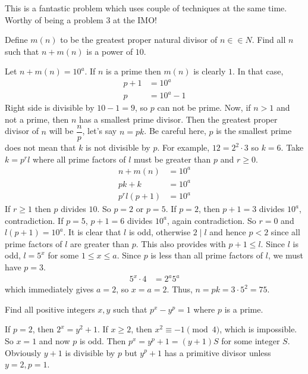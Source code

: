 \begin{note}
	This is a fantastic problem which uses couple of techniques at the same time. Worthy of being a problem $3$ at the IMO!
\end{note}

\begin{problem}
	Define $m(n)$ to be the greatest proper natural divisor of $n \in\in N$. Find all $n$ such that $n + m(n)$ is a power of $10$.
\end{problem}

\begin{solution}
	Let $n+m(n)=10^a$. If $n$ is a prime then $m(n)$ is clearly $1$. In that case,
	\begin{align*}
	p+1 & = 10^a\\
	p & = 10^a-1
	\end{align*}
	Right side is divisible by $10-1=9$, so $p$ can not be prime. Now, if $n>1$ and not a prime, then $n$ has a smallest prime divisor. Then the greatest proper divisor of $n$ will be $\dfrac{n}{p}$, let's say $n=pk$. Be careful here, $p$ is the smallest prime does not mean that $k$ is not divisible by $p$. For example, $12=2^2\cdot3$ so $k=6$. Take $k=p^rl$ where all prime factors of $l$ must be greater than $p$ and $r\geq0$.
	\begin{align*}
	n+m(n) & = 10^a\\
	pk+k & = 10^a\\
	p^rl(p+1) & = 10^a
	\end{align*}
	If $r\geq1$ then $p$ divides $10$. So $p=2$ or $p=5$. If $p=2$, then $p+1=3$ divides $10^a$, contradiction. If $p=5$, $p+1=6$ divides $10^a$, again contradiction. So $r=0$ and $l(p+1)=10^a$. It is clear that $l$ is odd, otherwise $2\mid l$ and hence $p<2$ since all prime factors of $l$ are greater than $p$. This also provides with $p+1\leq l$. Since $l$ is odd, $l=5^x$ for some $1\leq x\leq a$. Since $p$ is less than all prime factors of $l$, we must have $p=3$.
	\begin{align*}
	5^x\cdot4 & = 2^a5^a
	\end{align*}
	which immediately gives $a=2$, so $x=a=2$. Thus, $n=pk=3\cdot5^2=75$.
\end{solution}

\begin{problem}
	Find all positive integers $x, y$ such that $p^x - y^p = 1$ where $p$ is a prime.
\end{problem}

\begin{solution}
	If $p=2$, then $2^x=y^2+1$. If $x\geq2$, then $x^2\equiv-1\pmod4$, which is impossible. So $x=1$ and now $p$ is odd. Then $p^x=y^p+1=(y+1)S$ for some integer $S$. Obviously $y+1$ is divisible by $p$ but $y^p+1$ has a primitive divisor unless $y=2,p=1$.
\end{solution}

